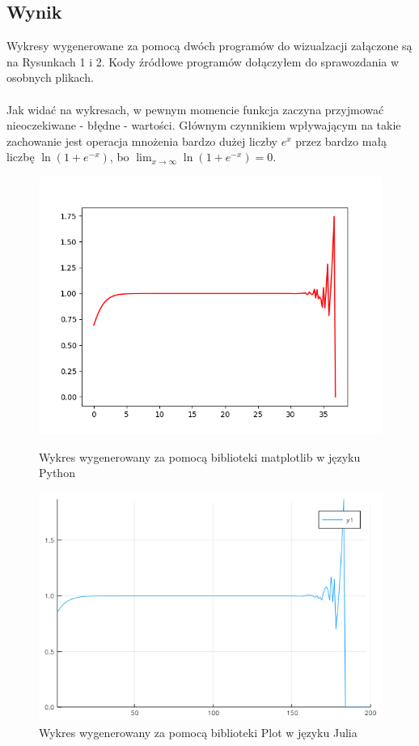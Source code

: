\subsection{Wynik}
Wykresy wygenerowane za pomocą dwóch programów do wizualzacji załączone są na Rysunkach 1 i 2. Kody źródłowe programów dołączyłem do sprawozdania w osobnych plikach. \\\\
Jak widać na wykresach, w pewnym momencie funkcja zaczyna przyjmować nieoczekiwane - błędne - wartości. Głównym czynnikiem wpływającym na takie zachowanie jest operacja mnożenia bardzo dużej liczby $ e^x $ przez bardzo małą liczbę $ \ln(1 + e ^{-x}) $, bo $ \lim_{x \to \infty} \ln (1 + e^{-x}) = 0$.
\begin{figure}[!htbp]
  \centering  
  \includegraphics[totalheight=7cm]{../source/task-2/matplotlib.png}
  \caption{Wykres wygenerowany za pomocą biblioteki matplotlib w języku Python}
  \includegraphics[totalheight=6cm]{../source/task-2/juliaplot.png}
  \caption{Wykres wygenerowany za pomocą biblioteki Plot w języku Julia}
\end{figure}
